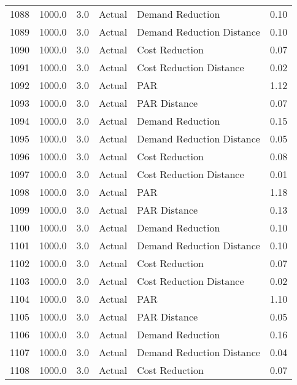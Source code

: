 \begin{longtable}{lrrllr}
1088 &       1000.0 &     3.0 &         Actual &           Demand Reduction &   0.10 \\
1089 &       1000.0 &     3.0 &         Actual &  Demand Reduction Distance &   0.10 \\
1090 &       1000.0 &     3.0 &         Actual &             Cost Reduction &   0.07 \\
1091 &       1000.0 &     3.0 &         Actual &    Cost Reduction Distance &   0.02 \\
1092 &       1000.0 &     3.0 &         Actual &                        PAR &   1.12 \\
1093 &       1000.0 &     3.0 &         Actual &               PAR Distance &   0.07 \\
1094 &       1000.0 &     3.0 &         Actual &           Demand Reduction &   0.15 \\
1095 &       1000.0 &     3.0 &         Actual &  Demand Reduction Distance &   0.05 \\
1096 &       1000.0 &     3.0 &         Actual &             Cost Reduction &   0.08 \\
1097 &       1000.0 &     3.0 &         Actual &    Cost Reduction Distance &   0.01 \\
1098 &       1000.0 &     3.0 &         Actual &                        PAR &   1.18 \\
1099 &       1000.0 &     3.0 &         Actual &               PAR Distance &   0.13 \\
1100 &       1000.0 &     3.0 &         Actual &           Demand Reduction &   0.10 \\
1101 &       1000.0 &     3.0 &         Actual &  Demand Reduction Distance &   0.10 \\
1102 &       1000.0 &     3.0 &         Actual &             Cost Reduction &   0.07 \\
1103 &       1000.0 &     3.0 &         Actual &    Cost Reduction Distance &   0.02 \\
1104 &       1000.0 &     3.0 &         Actual &                        PAR &   1.10 \\
1105 &       1000.0 &     3.0 &         Actual &               PAR Distance &   0.05 \\
1106 &       1000.0 &     3.0 &         Actual &           Demand Reduction &   0.16 \\
1107 &       1000.0 &     3.0 &         Actual &  Demand Reduction Distance &   0.04 \\
1108 &       1000.0 &     3.0 &         Actual &             Cost Reduction &   0.07 \\

\end{longtable}
